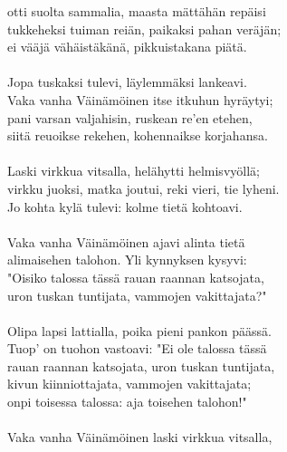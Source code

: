 otti suolta sammalia, maasta mättähän repäisi                   \\
tukkeheksi tuiman reiän, paikaksi pahan veräjän;                \\
ei vääjä vähäistäkänä, pikkuistakana piätä.                     \\
                                                                \\
Jopa tuskaksi tulevi, läylemmäksi lankeavi.                     \\
Vaka vanha Väinämöinen itse itkuhun hyräytyi;                   \\
pani varsan valjahisin, ruskean re'en etehen,                   \\
siitä reuoikse rekehen, kohennaikse korjahansa.                 \\
                                                                \\
Laski virkkua vitsalla, helähytti helmisvyöllä;                 \\
virkku juoksi, matka joutui, reki vieri, tie lyheni.            \\
Jo kohta kylä tulevi: kolme tietä kohtoavi.                     \\
                                                                \\
Vaka vanha Väinämöinen ajavi alinta tietä                       \\
alimaisehen talohon. Yli kynnyksen kysyvi:                      \\
"Oisiko talossa tässä rauan raannan katsojata,                  \\
uron tuskan tuntijata, vammojen vakittajata?"                   \\
                                                                \\
Olipa lapsi lattialla, poika pieni pankon päässä.               \\
Tuop' on tuohon vastoavi: "Ei ole talossa tässä                 \\
rauan raannan katsojata, uron tuskan tuntijata,                 \\
kivun kiinniottajata, vammojen vakittajata;                     \\
onpi toisessa talossa: aja toisehen talohon!"                   \\
                                                                \\
Vaka vanha Väinämöinen laski virkkua vitsalla,                  \\
